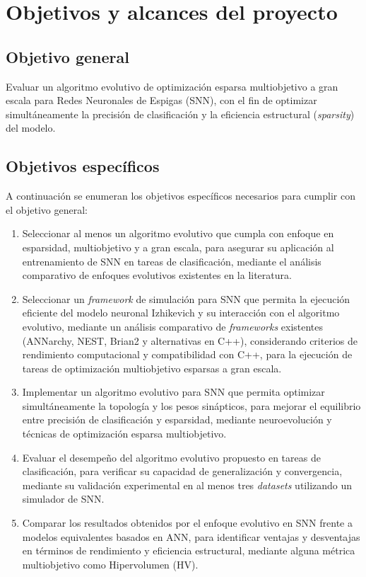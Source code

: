 \section{Objetivos y alcances del proyecto}

\subsection{Objetivo general}
Evaluar un algoritmo evolutivo de optimización esparsa multiobjetivo a gran escala para Redes Neuronales de Espigas (SNN), con el fin de optimizar simultáneamente la precisión de clasificación y la eficiencia estructural (\textit{sparsity}) del modelo.

\subsection{Objetivos específicos}\label{sec:objetivos-especificos}
A continuación se enumeran los objetivos específicos necesarios para cumplir con el objetivo general:
\begin{enumerate}
    \item Seleccionar al menos un algoritmo evolutivo que cumpla con enfoque en esparsidad, multiobjetivo y a gran escala, para asegurar su aplicación al entrenamiento de SNN en tareas de clasificación, mediante el análisis comparativo de enfoques evolutivos existentes en la literatura.
    \item Seleccionar un \textit{framework} de simulación para SNN que permita la ejecución eficiente del modelo neuronal Izhikevich y su interacción con el algoritmo evolutivo, mediante un análisis comparativo de \textit{frameworks} existentes (ANNarchy, NEST, Brian2 y alternativas en C++), considerando criterios de rendimiento computacional y compatibilidad con C++, para la ejecución de tareas de optimización multiobjetivo esparsas a gran escala.
    \item Implementar un algoritmo evolutivo para SNN que permita optimizar simultáneamente la topología y los pesos sinápticos, para mejorar el equilibrio entre precisión de clasificación y esparsidad, mediante neuroevolución y técnicas de optimización esparsa multiobjetivo.
    \item Evaluar el desempeño del algoritmo evolutivo propuesto en tareas de clasificación, para verificar su capacidad de generalización y convergencia, mediante su validación experimental en al menos tres \textit{datasets} utilizando un simulador de SNN.
    \item Comparar los resultados obtenidos por el enfoque evolutivo en SNN frente a modelos equivalentes basados en ANN, para identificar ventajas y desventajas en términos de rendimiento y eficiencia estructural, mediante alguna métrica multiobjetivo como Hipervolumen (HV).
\end{enumerate}

